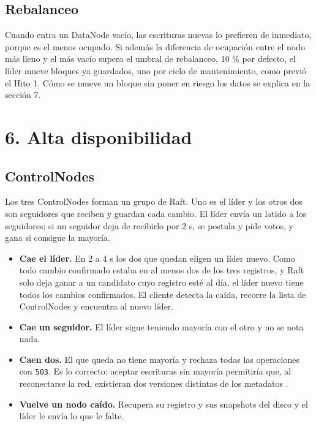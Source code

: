 \documentclass[10pt]{article}
\begin{document}
\subsection{Rebalanceo}

Cuando entra un DataNode vacío, las escrituras nuevas lo prefieren de inmediato, porque es el menos ocupado. Si además la diferencia de ocupación entre el nodo más lleno y el más vacío supera el umbral de rebalanceo, 10 \% por defecto, el líder mueve bloques ya guardados, uno por ciclo de mantenimiento, como previó el Hito 1. Cómo se mueve un bloque sin poner en riesgo los datos se explica en la sección 7.

\separador

\section{6. Alta disponibilidad}

\subsection{ControlNodes}

Los tres ControlNodes forman un grupo de Raft. Uno es el líder y los otros dos son seguidores que reciben y guardan cada cambio. El líder envía un latido a los seguidores; si un seguidor deja de recibirlo por 2 s, se postula y pide votos, y gana si consigue la mayoría.

\begin{itemize}
\item \textbf{Cae el líder.} En 2 a 4 s los dos que quedan eligen un líder nuevo. Como todo cambio confirmado estaba en al menos dos de los tres registros, y Raft solo deja ganar a un candidato cuyo registro esté al día, el líder nuevo tiene todos los cambios confirmados. El cliente detecta la caída, recorre la lista de ControlNodes y encuentra al nuevo líder.
\item \textbf{Cae un seguidor.} El líder sigue teniendo mayoría con el otro y no se nota nada.
\item \textbf{Caen dos.} El que queda no tiene mayoría y rechaza todas las operaciones con \texttt{503}. Es lo correcto: aceptar escrituras sin mayoría permitiría que, al reconectarse la red, existieran dos versiones distintas de los metadatos .
\item \textbf{Vuelve un nodo caído.} Recupera su registro y sus snapshots del disco y el líder le envía lo que le falte.
\end{itemize}
\end{document}
